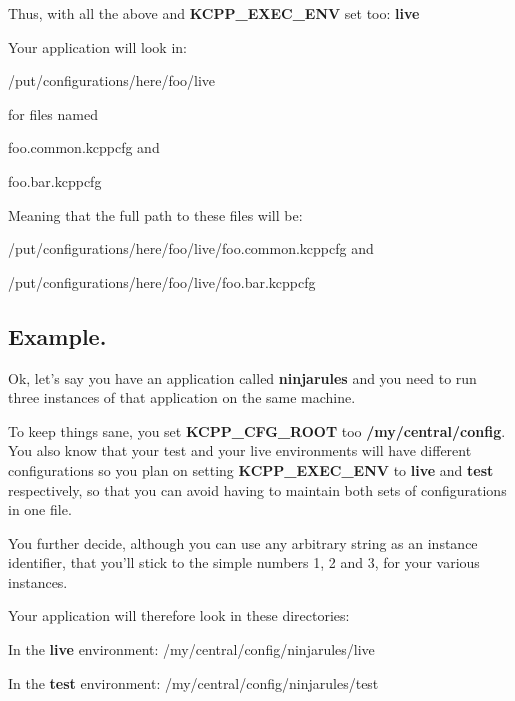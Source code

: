 Thus, with all the above and {\bfseries K\-C\-P\-P\-\_\-\-E\-X\-E\-C\-\_\-\-E\-N\-V} set too\-: {\bfseries live}

Your application will look in\-:
\begin{DoxyItemize}
\item /put/configurations/here/foo/live
\item for files named
\begin{DoxyItemize}
\item foo.\-common.\-kcppcfg and
\item foo.\-bar.\-kcppcfg
\end{DoxyItemize}
\end{DoxyItemize}

Meaning that the full path to these files will be\-:
\begin{DoxyItemize}
\item /put/configurations/here/foo/live/foo.common.\-kcppcfg and
\item /put/configurations/here/foo/live/foo.bar.\-kcppcfg
\end{DoxyItemize}

\subsection*{Example.}

Ok, let's say you have an application called {\bfseries ninjarules} and you need to run three instances of that application on the same machine.

To keep things sane, you set {\bfseries K\-C\-P\-P\-\_\-\-C\-F\-G\-\_\-\-R\-O\-O\-T} too {\bfseries /my/central/config}. You also know that your test and your live environments will have different configurations so you plan on setting {\bfseries K\-C\-P\-P\-\_\-\-E\-X\-E\-C\-\_\-\-E\-N\-V} to {\bfseries live} and {\bfseries test} respectively, so that you can avoid having to maintain both sets of configurations in one file.

You further decide, although you can use any arbitrary string as an instance identifier, that you'll stick to the simple numbers 1, 2 and 3, for your various instances.

Your application will therefore look in these directories\-:
\begin{DoxyItemize}
\item In the {\bfseries live} environment\-: /my/central/config/ninjarules/live
\item In the {\bfseries test} environment\-: /my/central/config/ninjarules/test
\end{DoxyItemize}

